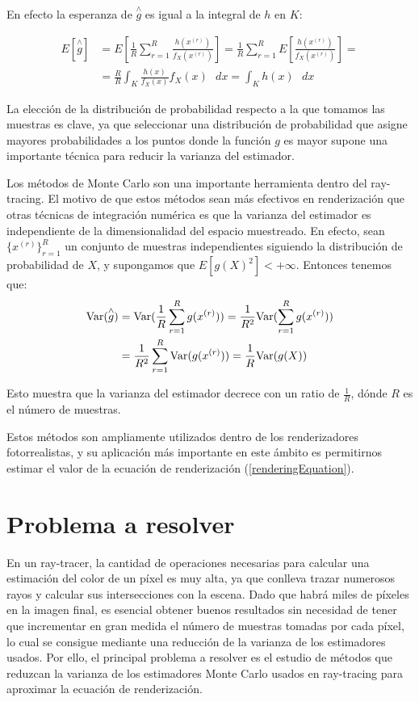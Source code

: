 En efecto la esperanza de $\overset{\wedge}{g}$ es igual a la integral de $h$ en $K$:

\begin{align*}
E[\overset{\wedge}{g}] &= E[\frac{1}{R}\sum_{r=1}^R \frac{h(x^{(r)})}{f_X(x^{(r)})}] = \frac{1}{R}\sum_{r=1}^R E[\frac{h(x^{(r)})}{f_X(x^{(r)})}] =\\
&= \frac{R}{R}  \int _K \frac{h(x)}{f_X(x)}f_X(x) \text{ }dx = \int _K h(x) \text{ }dx
\end{align*}

La elección de la distribución de probabilidad respecto a la que tomamos las muestras es clave, ya que seleccionar una distribución de probabilidad que asigne mayores probabilidades a los puntos donde la función $g$ es mayor supone una importante técnica para reducir la varianza del estimador.

Los métodos de Monte Carlo son una importante herramienta dentro del ray-tracing. El motivo de que estos métodos sean más efectivos en renderización que otras técnicas de integración numérica es que la varianza del estimador es independiente de la dimensionalidad del espacio muestreado. En efecto, sean $\{x^{(r)}\}_{r=1}^R$ un conjunto de muestras independientes siguiendo la distribución de probabilidad de $X$, y supongamos que $E[g(X)^2]< +\infty$. Entonces tenemos que:
\begin{align*}
\mathrm{Var}(\overset{\wedge}{g}) &= \mathrm{Var}(\frac{1}{R}\sum_{r=1}^R g(x^{(r)})) = \frac{1}{R^2}\mathrm{Var}(\sum_{r=1}^R g(x^{(r)})) \\
&= \frac{1}{R^2}\sum_{r=1}^R \mathrm{Var}(g(x^{(r)})) = \frac{1}{R} \mathrm{Var}(g(X))
\end{align*}

Esto muestra que la varianza del estimador decrece con un ratio de $\frac{1}{R}$, dónde $R$ es el número de muestras. 

Estos métodos son ampliamente utilizados dentro de los renderizadores fotorrealistas, y su aplicación más importante en este ámbito es permitirnos estimar el valor de la ecuación de renderización (\ref{renderingEquation}). 

\section{Problema a resolver}
En un ray-tracer, la cantidad de operaciones necesarias para calcular una estimación del color de un píxel es muy alta, ya que conlleva trazar numerosos rayos y calcular sus intersecciones con la escena. Dado que habrá miles de píxeles en la imagen final, es esencial obtener buenos resultados sin necesidad de tener que incrementar en gran medida el número de muestras tomadas por cada píxel, lo cual se consigue mediante una reducción de la varianza de los estimadores usados. Por ello, el principal problema a resolver es el estudio de métodos que reduzcan la varianza de los estimadores Monte Carlo usados en ray-tracing para aproximar la ecuación de renderización.

